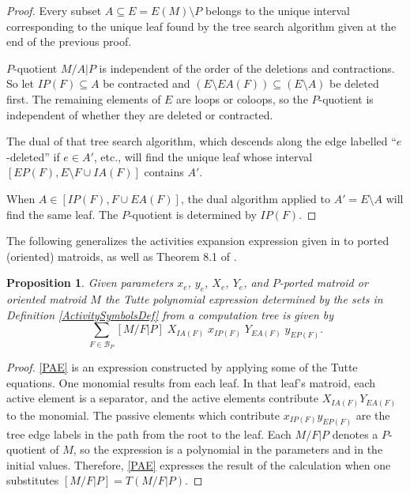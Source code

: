 \documentclass[12pt,leqno]{amsart}
\newtheorem{prop}[lem]{Proposition}
\theoremstyle{remark}
\begin{document}
\begin{proof}
Every subset $A\subseteq E=E(M)\setminus P$ belongs to the
unique interval corresponding to the unique leaf found by the tree search 
algorithm given at the end of the previous proof.  

$P$-quotient $M/A|P$ is independent of the order of the
deletions and contractions.  So let $IP(F)\subseteq A$ be contracted
and $(E\setminus EA(F))\subseteq (E\setminus A)$ be deleted first.
The remaining elements of $E$ are loops or coloops, so the $P$-quotient
is independent of whether they are deleted or contracted.

The dual of that tree search algorithm, which descends along
the edge labelled ``$e$-deleted'' if $e\in A'$, etc., will find the
unique leaf whose interval $[EP(F),E\setminus F\cup IA(F)]$ contains
$A'$.

When $A\in[IP(F),F\cup EA(F)]$, the dual algorithm applied to
$A'=E\setminus A$ will find the same leaf.  The $P$-quotient is
determined by $IP(F)$.
\end{proof}


The following generalizes the activities expansion expression given
in \cite{MR93a:05047} to ported (oriented) matroids, as well as 
Theorem 8.1 of \cite{SetPointedLV}. 

\begin{prop}
\label{TuttePolyExpression}
Given parameters $x_e$, $y_e$, $X_e$, $Y_e$, and 
$P$-ported matroid or oriented matroid $M$
the Tutte polynomial expression
determined by the sets in Definition 
\ref{ActivitySymbolsDef} 
from a computation tree is 
given by
\begin{equation}
\tag{PAE}
\label{PAE}
\sum_{F\in \mathcal{B}_P}[M/F|P]
\;X_{IA(F)}\;x_{IP(F)}\;Y_{EA(F)}\;y_{EP(F)}.
\end{equation}
\end{prop}

\begin{proof}
\eqref{PAE} is an expression constructed by applying some of the
Tutte equations.  One monomial results from each leaf.
In that leaf's matroid,
each active element is a separator, and the active elements
contribute $X_{IA(F)}Y_{EA(F)}$ to the monomial.
The passive elements which contribute
$x_{IP(F)}y_{EP(F)}$
are the tree
edge labels in the path from the root to the leaf.
Each $M/F|P$ denotes a $P$-quotient of $M$, so the
expression is a polynomial in the parameters and in the
initial values.  
Therefore, \eqref{PAE} expresses the result of
the calculation when one substitutes
$[M/F|P]=T(M/F|P)$.
\end{proof}
\end{document}
